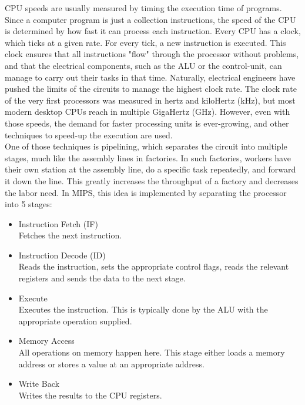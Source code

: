 CPU speeds are usually measured by timing the execution time of programs. Since
a computer program is just a collection instructions, the speed of the CPU is
determined by how fast it can process each instruction.
Every CPU has a clock, which ticks at a given rate. For every tick, a new
instruction is executed. This clock ensures that all instructions "flow" through
the processor without problems, and that the electrical components, such as the
ALU or the control-unit, can manage to carry out their tasks in that time.
Naturally, electrical engineers have pushed the limits of the circuits to manage
the highest clock rate. The clock rate of the very first processors was measured
in hertz and kiloHertz (kHz), but most modern desktop CPUs reach in multiple
GigaHertz (GHz)\cite{wiki:clock_rate}. However, even with those speeds, the
demand for faster processing units is ever-growing, and other techniques to speed-up
the execution are used.\\
One of those techniques is pipelining, which separates the circuit into multiple
stages, much like the assembly lines in factories. In such factories, workers
have their own station at the assembly line, do a specific task repeatedly, and
forward it down the line. This greatly increases the throughput of a factory and
decreases the labor need.
In MIPS, this idea is implemented by separating the processor into 5 stages\cite{COD5}:
\begin{itemize}
	\item Instruction Fetch (IF)\\
Fetches the next instruction.

	\item Instruction Decode (ID)\\
Reads the instruction, sets the appropriate control flags, reads the relevant
registers and sends the data to the next stage.

	\item Execute\\
Executes the instruction. This is typically done by the ALU with the appropriate
operation supplied.

	\item Memory Access\\
All operations on memory happen here. This stage either loads a memory address
or stores a value at an appropriate address.

	\item Write Back\\
Writes the results to the CPU registers.
\end{itemize}
